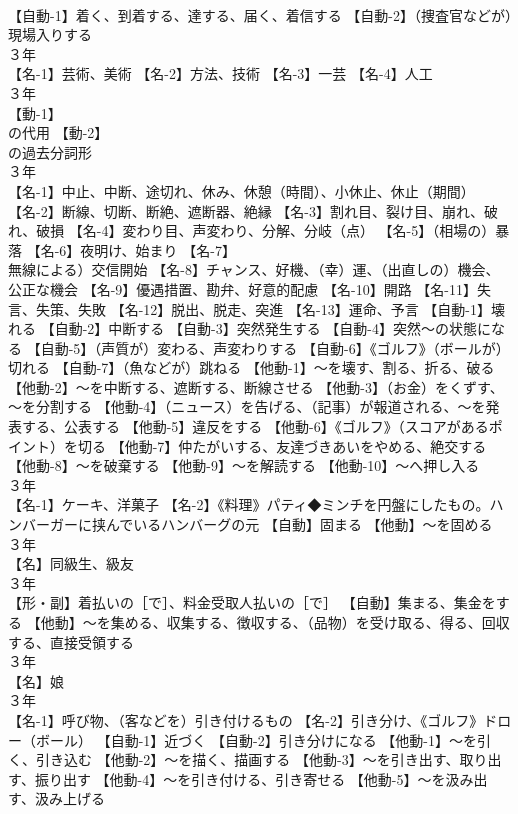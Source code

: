 \documentclass[8pt]{extreport}
\begin{document}
\begin{CJK}{UTF8}{min}
\\	【自動-1】着く、到着する、達する、届く、着信する 【自動-2】（捜査官などが）現場入りする
\\	３年	
\\	【名-1】芸術、美術 【名-2】方法、技術 【名-3】一芸 【名-4】人工
\\	３年	
\\	【動-1】
\\	の代用 【動-2】
\\	の過去分詞形
\\	３年	
\\	【名-1】中止、中断、途切れ、休み、休憩（時間）、小休止、休止（期間） 【名-2】断線、切断、断絶、遮断器、絶縁 【名-3】割れ目、裂け目、崩れ、破れ、破損 【名-4】変わり目、声変わり、分解、分岐（点） 【名-5】（相場の）暴落 【名-6】夜明け、始まり 【名-7】
\\	無線による）交信開始 【名-8】チャンス、好機、（幸）運、（出直しの）機会、公正な機会 【名-9】優遇措置、勘弁、好意的配慮 【名-10】開路 【名-11】失言、失策、失敗 【名-12】脱出、脱走、突進 【名-13】運命、予言 【自動-1】壊れる 【自動-2】中断する 【自動-3】突然発生する 【自動-4】突然～の状態になる 【自動-5】（声質が）変わる、声変わりする 【自動-6】《ゴルフ》（ボールが）切れる 【自動-7】（魚などが）跳ねる 【他動-1】～を壊す、割る、折る、破る 【他動-2】～を中断する、遮断する、断線させる 【他動-3】（お金）をくずす、～を分割する 【他動-4】（ニュース）を告げる、（記事）が報道される、～を発表する、公表する 【他動-5】違反をする 【他動-6】《ゴルフ》（スコアがあるポイント）を切る 【他動-7】仲たがいする、友達づきあいをやめる、絶交する 【他動-8】～を破棄する 【他動-9】～を解読する 【他動-10】～へ押し入る
\\	３年	
\\	【名-1】ケーキ、洋菓子 【名-2】《料理》パティ◆ミンチを円盤にしたもの。ハンバーガーに挟んでいるハンバーグの元 【自動】固まる 【他動】～を固める
\\	３年	
\\	【名】同級生、級友
\\	３年	
\\	【形・副】着払いの［で］、料金受取人払いの［で］ 【自動】集まる、集金をする 【他動】～を集める、収集する、徴収する、（品物）を受け取る、得る、回収する、直接受領する
\\	３年	
\\	【名】娘
\\	３年	
\\	【名-1】呼び物、（客などを）引き付けるもの 【名-2】引き分け、《ゴルフ》ドロー（ボール） 【自動-1】近づく 【自動-2】引き分けになる 【他動-1】～を引く、引き込む 【他動-2】～を描く、描画する 【他動-3】～を引き出す、取り出す、振り出す 【他動-4】～を引き付ける、引き寄せる 【他動-5】～を汲み出す、汲み上げる

\end{CJK}
\end{document}
